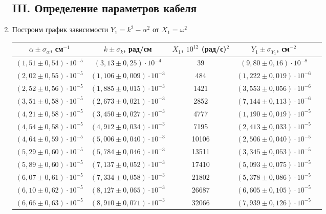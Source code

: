 \documentclass[a4paper]{article}
\begin{document}
\begin{enumerate}
\subsection*{III. Определение параметров кабеля}

    \item Построим график зависимости $Y_1 = k^2 - \alpha^2$ от $X_1 = \omega^2$
\clearpage
\begin{table}[h!]
    \centering
    \begin{tabular}{|c|c|c|c|c|}
        \hline
        $\alpha \pm \sigma_{\alpha}$, см$^{-1}$ & $k \pm \sigma_k$, рад/см & $X_1$, $10^{12}$ (рад/с)$^2$ & $Y_1 \pm \sigma_{Y_1}$, см$^{-2}$ \\ \hline
        $(1,51 \pm 0,54) \cdot 10^{-5}$ & $(3,13 \pm 0,25) \cdot 10^{-4}$ & 39 & $(9,80 \pm 0,16) \cdot 10^{-8}$ \\ \hline
        $(2,02 \pm 0,55) \cdot 10^{-5}$ & $(1,106 \pm 0,009) \cdot 10^{-3}$ & 484 & $(1,222 \pm 0,019) \cdot 10^{-6}$ \\ \hline
        $(2,52 \pm 0,56) \cdot 10^{-5}$ & $(1,885 \pm 0,015) \cdot 10^{-3}$ & 1421 & $(3,553 \pm 0,056) \cdot 10^{-6}$ \\ \hline
        $(3,51 \pm 0,58) \cdot 10^{-5}$ & $(2,673 \pm 0,021) \cdot 10^{-3}$ & 2852 & $(7,144 \pm 0,113) \cdot 10^{-6}$ \\ \hline
        $(4,21 \pm 0,58) \cdot 10^{-5}$ & $(3,450 \pm 0,027) \cdot 10^{-3}$ & 4777 & $(1,190 \pm 0,019) \cdot 10^{-5}$ \\ \hline
        $(4,54 \pm 0,58) \cdot 10^{-5}$ & $(4,912 \pm 0,034) \cdot 10^{-3}$ & 7195 & $(2,413 \pm 0,033) \cdot 10^{-5}$ \\ \hline
        $(4,64 \pm 0,59) \cdot 10^{-5}$ & $(5,006 \pm 0,040) \cdot 10^{-3}$ & 10106 & $(2,506 \pm 0,040) \cdot 10^{-5}$ \\ \hline
        $(5,29 \pm 0,60) \cdot 10^{-5}$ & $(5,784 \pm 0,046) \cdot 10^{-3}$ & 13511 & $(3,345 \pm 0,053) \cdot 10^{-5}$ \\ \hline
        $(5,89 \pm 0,60) \cdot 10^{-5}$ & $(7,137 \pm 0,052) \cdot 10^{-3}$ & 17410 & $(5,093 \pm 0,075) \cdot 10^{-5}$ \\ \hline
        $(6,07 \pm 0,61) \cdot 10^{-5}$ & $(7,334 \pm 0,058) \cdot 10^{-3}$ & 21802 & $(5,378 \pm 0,086) \cdot 10^{-5}$ \\ \hline
        $(6,10 \pm 0,62) \cdot 10^{-5}$ & $(8,127 \pm 0,065) \cdot 10^{-3}$ & 26687 & $(6,605 \pm 0,105) \cdot 10^{-5}$ \\ \hline
        $(6,66 \pm 0,63) \cdot 10^{-5}$ & $(8,910 \pm 0,071) \cdot 10^{-3}$ & 32066 & $(7,939 \pm 0,126) \cdot 10^{-5}$ \\ \hline

\end{tabular}
\end{table}
\end{enumerate}
\end{document}
